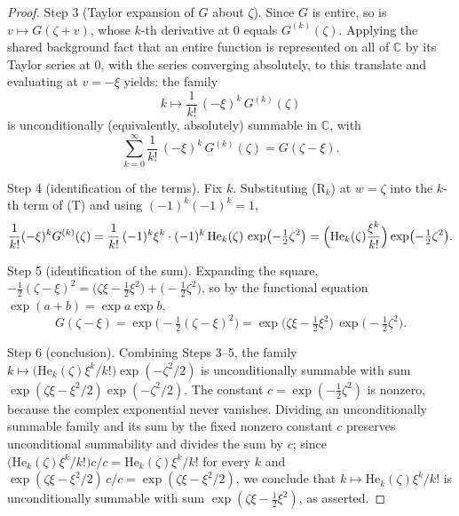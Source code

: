 \begin{proof}
Step 3 (Taylor expansion of $G$ about $\zeta$).  Since $G$ is entire, so is
$v \mapsto G(\zeta + v)$, whose $k$-th derivative at $0$ equals $G^{(k)}(\zeta)$.
Applying the shared background fact that an entire function is represented on all
of $\mathbb{C}$ by its Taylor series at $0$, with the series converging
absolutely, to this translate and evaluating at $v = -\xi$ yields: the family
\[
  k \longmapsto \frac{1}{k!}\,(-\xi)^k\,G^{(k)}(\zeta)
\]
is unconditionally (equivalently, absolutely) summable in $\mathbb{C}$, with
\[
  \sum_{k=0}^\infty \frac{1}{k!}\,(-\xi)^k\,G^{(k)}(\zeta) = G(\zeta - \xi).
  \tag{T}
\]

Step 4 (identification of the terms).  Fix $k$.  Substituting (R$_k$) at
$w = \zeta$ into the $k$-th term of (T) and using $(-1)^k(-1)^k = 1$,
\[
  \frac{1}{k!}(-\xi)^k G^{(k)}(\zeta)
    = \frac{1}{k!}\,(-1)^k\xi^k \cdot (-1)^k\,\mathrm{He}_k(\zeta)\,
        \exp\bigl(-\tfrac{1}{2}\zeta^2\bigr)
    = \Bigl(\mathrm{He}_k(\zeta)\frac{\xi^k}{k!}\Bigr)
        \exp\bigl(-\tfrac{1}{2}\zeta^2\bigr).
\]

Step 5 (identification of the sum).  Expanding the square,
$-\tfrac12(\zeta-\xi)^2 = \bigl(\zeta\xi - \tfrac12\xi^2\bigr)
 + \bigl(-\tfrac12\zeta^2\bigr)$, so by the functional equation
$\exp(a+b) = \exp a \exp b$,
\[
  G(\zeta - \xi) = \exp\bigl(-\tfrac12(\zeta-\xi)^2\bigr)
    = \exp\bigl(\zeta\xi - \tfrac12\xi^2\bigr)\,
      \exp\bigl(-\tfrac12\zeta^2\bigr).
\]

Step 6 (conclusion).  Combining Steps 3--5, the family
$k \mapsto \bigl(\mathrm{He}_k(\zeta)\xi^k/k!\bigr)\exp(-\zeta^2/2)$ is
unconditionally summable with sum
$\exp(\zeta\xi - \xi^2/2)\exp(-\zeta^2/2)$.  The constant
$c = \exp(-\tfrac12\zeta^2)$ is nonzero, because the complex exponential never
vanishes.  Dividing an unconditionally summable family and its sum by the fixed
nonzero constant $c$ preserves unconditional summability and divides the sum by
$c$; since $\bigl(\mathrm{He}_k(\zeta)\xi^k/k!\bigr)c/c
 = \mathrm{He}_k(\zeta)\xi^k/k!$ for every $k$ and
$\exp(\zeta\xi-\xi^2/2)\,c/c = \exp(\zeta\xi-\xi^2/2)$, we conclude that
$k \mapsto \mathrm{He}_k(\zeta)\xi^k/k!$ is unconditionally summable with sum
$\exp(\zeta\xi - \tfrac12\xi^2)$, as asserted.
\end{proof}
